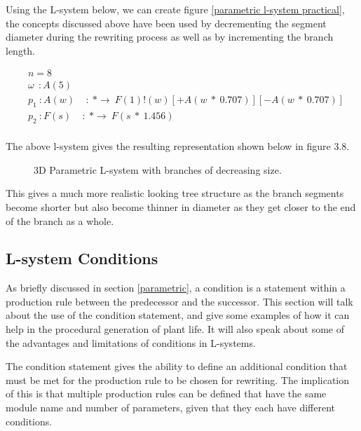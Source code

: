 Using the L-system below, we can create figure \ref{parametric l-system practical}, the concepts discussed above have been used by decrementing the segment diameter during the rewriting process as well as by incrementing the branch length.

\begin{singlespace}
\begin{equation} \label{parametric l-system practical}
\begin{aligned}
	&n=8 \\
	&\omega~~ : A(5)\\
	&p_1~ :  A(w)~~~~~ :~ * \rightarrow~ F(1)!(w)[+A(w~*~0.707)][-A(w~*~0.707)]\\
	&p_2~ :  F(s)~~~~~ :~ * \rightarrow~ F(s~*~1.456)\\
\end{aligned}
\end{equation}
\end{singlespace}

\vspace{5mm} 
The above l-system gives the resulting representation shown below in figure 3.8. 

\begin{figure}[htbp]
	{\centering
		\vspace{7px}
		\setlength{\fboxrule}{1pt}
		\caption{3D Parametric L-system with branches of decreasing size.}
	}
\end{figure}
\FloatBarrier

\noindent
This gives a much more realistic looking tree structure as the branch segments become shorter but also become thinner in diameter as they get closer to the end of the branch as a whole. 


\subsection{L-system Conditions} \label{Condition L-system Subsection}

As briefly discussed in section \ref{parametric}, a condition is a statement within a production rule between the predecessor and the successor. This section will talk about the use of the condition statement, and give some examples of how it can help in the procedural generation of plant life. It will also speak about some of the advantages and limitations of conditions in L-systems.

The condition statement gives the ability to define an additional condition that must be met for the production rule to be chosen for rewriting. The implication of this is that multiple production rules can be defined that have the same module name and number of parameters, given that they each have different conditions.

